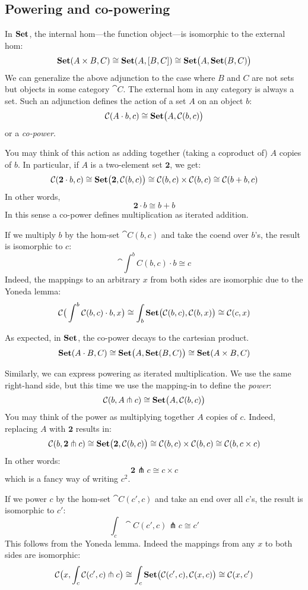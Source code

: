 \documentclass[DaoFP]{subfiles}
\begin{document}
\subsection{Powering and co-powering}

In $\mathbf{Set}$, the internal hom---the function object---is isomorphic to the external hom:
\[ \mathbf{Set} (A \times B, C) \cong \mathbf{Set}(A, [B, C]) \cong \mathbf{Set} \big(A, \mathbf{Set} (B, C)\big) \]
We can generalize the above adjunction to the case where $B$ and $C$ are not sets but objects in some category $\cat C$. The external hom in any category is always a set. Such an adjunction defines the action of a set $A$ on an object $b$:
\[ \mathcal{C} (A \cdot b, c) \cong \mathbf{Set} \big( A, \mathcal{C} (b, c)\big) \]
or a \emph{co-power}.

You may think of this action as adding together (taking a coproduct of) $A$ copies of $b$. In particular, if $A$ is a two-element set $\mathbf 2$, we get:
\[ \mathcal{C} (\mathbf 2 \cdot b, c) \cong \mathbf{Set} \big( \mathbf 2, \mathcal{C} (b, c)\big) \cong \mathcal{C}(b, c) \times \mathcal{C}(b, c) \cong \mathcal{C}(b + b, c) \]
In other words, 
\[ \mathbf 2 \cdot b \cong b + b \]
In this sense a co-power defines multiplication as iterated addition. 

If we multiply $b$ by the hom-set $\cat C (b, c)$ and take the coend over $b$'s, the result is isomorphic to $c$:
\[ \cat \int^b C(b, c) \cdot b \cong c \]
Indeed, the mappings to an arbitrary $x$ from both sides are isomorphic due to the Yoneda lemma:
\[ \mathcal{C} \big( \int^b \mathcal{C}(b, c) \cdot b, x\big) \cong \int_b \mathbf{Set} \big( \mathcal{C}(b, c), \mathcal{C} (b, x)\big) \cong \mathcal{C} (c, x)\]



As expected, in $\mathbf{Set}$, the co-power decays to the cartesian product.
\[ \mathbf{Set} (A \cdot B, C) \cong \mathbf{Set} \big( A, \mathbf{Set}(B, C)\big) \cong \mathbf{Set} (A \times B, C) \]

Similarly, we can express powering as iterated multiplication. We use the same right-hand side, but this time we use the mapping-in to define the \emph{power}:
\[ \mathcal{C} (b, A \pitchfork c) \cong \mathbf{Set}  \big(A, \mathcal{C}(b, c)\big) \]
You may think of the power as multiplying together $A$ copies of $c$. Indeed, replacing $A$ with $\mathbf 2$ results in:
\[ \mathcal{C} (b, \mathbf 2 \pitchfork c) \cong \mathbf{Set}  \big(\mathbf 2, \mathcal{C}(b, c)\big) \cong \mathcal{C}(b, c) \times \mathcal{C}(b, c) \cong \mathcal{C} (b, c \times c)\]
In other words:
\[ \mathbf 2 \pitchfork c \cong c \times c \]
which is a fancy way of writing $c^2$.

If we power $c$ by the hom-set $\cat C(c', c)$ and take an end over all $c$'s, the result is isomorphic to $c'$:
\[ \int_c \cat C (c', c) \pitchfork c \cong c' \]
This follows from the Yoneda lemma. Indeed the mappings from any $x$ to both sides are isomorphic:
\[ \mathcal{C} \big(x, \int_c \mathcal{C} (c', c) \pitchfork c\big) \cong \int_c \mathbf{Set} \big( \mathcal{C}(c', c), \mathcal{C}(x, c)\big)  \cong \mathcal{C} (x, c') \]
\end{document}
